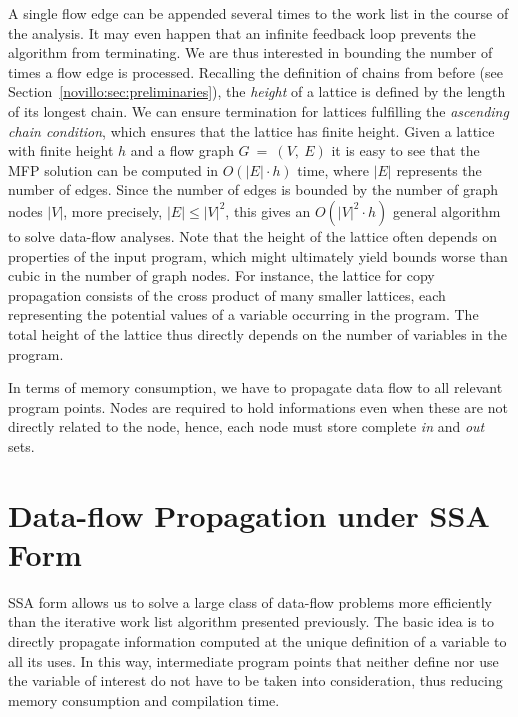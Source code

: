 A single flow edge can be appended several times to the
work list in the course of the analysis. It may even happen that an infinite
feedback loop prevents the algorithm from terminating. We are thus interested in
bounding the number of times a flow edge is processed. Recalling the definition
of chains from before (see Section~\ref{novillo:sec:preliminaries}),
 the \emph{height} of a
lattice is defined by the length of its longest chain. We can ensure termination
for lattices fulfilling the \emph{ascending chain condition}, which ensures that
the lattice has finite height. Given a lattice with finite height $h$ and a flow
graph $G~=~(V,~E)$ it is easy to see that the MFP solution can be computed in
$O(|E| \cdot h)$ time, where $|E|$ represents the number of edges. Since the
number of edges is bounded by the number of graph nodes $|V|$, more precisely,
$|E| \leq |V|^2$, this gives an $O(|V|^2 \cdot h)$ general algorithm to
solve data-flow analyses. Note that the height of
the lattice often depends on properties of the input program, which might
ultimately yield bounds worse than cubic in the number of graph nodes. For
instance, the lattice for copy propagation consists of the cross product of many
smaller lattices, each representing the potential values of a variable occurring
in the program. The total height of the lattice thus directly depends on the
number of variables in the program.

In terms of memory consumption, we have to propagate data flow to all relevant
program points. Nodes are required to hold informations even when these
are not directly related to the node, hence, each node must store 
complete \emph{in} and \emph{out} sets.


\section{Data-flow Propagation under SSA Form}
\label{chapter:constant_propagation_is_easier:sec:prop-engine}
\label{sec:prop-engine}

SSA form allows us to solve a large class of data-flow problems more efficiently
than the iterative work list algorithm presented previously.
The basic idea is to directly propagate information computed at the unique
definition of a variable to all its uses. In this way, intermediate program
points that neither define nor use the variable of interest do not have to
be taken into consideration, thus reducing memory consumption
and compilation time.


